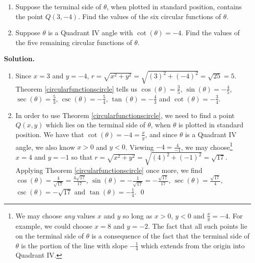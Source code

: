\begin{ex} \label{circularfunctionscircleex} $~$

\begin{enumerate}

\item  Suppose the terminal side of $\theta$, when plotted in standard position, contains the point $Q(3,-4)$.  Find the values of the six circular functions of $\theta$.

\item  Suppose $\theta$ is a Quadrant IV angle with $\cot(\theta) = -4$.  Find the values of the five remaining circular functions of $\theta$.

\end{enumerate}

{\bf Solution.}

\begin{enumerate}

\item    Since $x = 3$ and $y=-4$, $r = \sqrt{x^2 + y^2} = \sqrt{(3)^2+(-4)^2} = \sqrt{25} = 5$. Theorem \ref{circularfunctionscircle} tells us $\cos(\theta) = \frac{3}{5}$, $\sin(\theta) = -\frac{4}{5}$, $\sec(\theta) = \frac{5}{3}$, $\csc(\theta) = -\frac{5}{4}$, $\tan(\theta) = -\frac{4}{3}$ and $\cot(\theta) = - \frac{3}{4}$.

\item In order to use Theorem \ref{circularfunctionscircle}, we need to find a point $Q(x,y)$ which lies on the terminal side of $\theta$, when $\theta$ is plotted in standard position.  We have that $\cot(\theta) = -4 =  \frac{x}{y}$,  and since $\theta$ is a Quadrant IV angle, we also know $x>0$ and $y< 0$.  Viewing $-4 = \frac{4}{-1}$, we may choose\footnote{We may choose \textit{any} values $x$ and $y$ so long as $x>0$, $y<0$ and $\frac{x}{y} = -4$.  For example, we could choose $x=8$ and $y=-2$.  The fact that all such points lie on the terminal side of $\theta$ is a consequence of the fact that the terminal side of $\theta$ is the portion of the line with slope $-\frac{1}{4}$ which extends from the origin into Quadrant IV.}   $x = 4$ and $y = -1$ so that $r = \sqrt{x^2+y^2} = \sqrt{(4)^2 + (-1)^2} = \sqrt{17}$.  Applying Theorem \ref{circularfunctionscircle} once more, we find $\cos(\theta) = \frac{4}{\sqrt{17}} = \frac{4 \sqrt{17}}{17}$,  $\sin(\theta) =- \frac{1}{\sqrt{17}} = -\frac{\sqrt{17}}{17}$, $\sec(\theta) = \frac{\sqrt{17}}{4}$, $\csc(\theta) = - \sqrt{17}$ and $\tan(\theta) = -\frac{1}{4}$. \qed  

\end{enumerate}

\end{ex}

